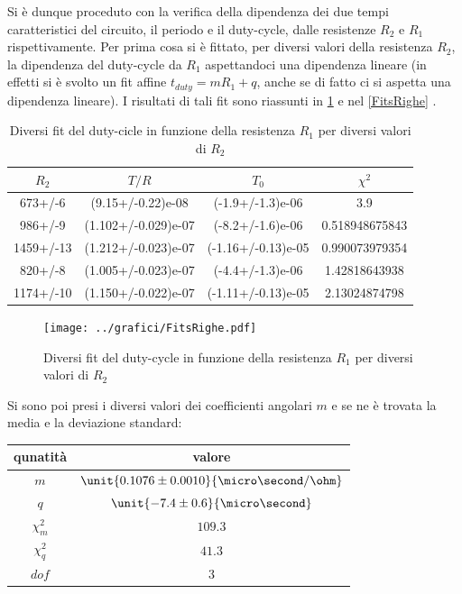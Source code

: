 \documentclass[a4paper,10pt]{article}
\begin{document}
Si è dunque proceduto con la verifica della dipendenza dei due tempi caratteristici del circuito, il periodo e il duty-cycle, dalle resistenze $R_2$ e $R_1$ rispettivamente. Per prima cosa si è fittato, per diversi valori della resistenza $R_2$, la dipendenza del duty-cycle da $R_1$ aspettandoci una dipendenza lineare (in effetti si è svolto un fit affine $t_{duty}=mR_1+q$, anche se di fatto ci si aspetta una dipendenza lineare). I risultati di tali fit sono riassunti in \cref{tab:DutyFit} e nel \cref{FitsRighe} . 

\begin{table}[H]
\centering
\begin{tabular}{c|c|c|c} 
$R_2$ & $T/R$ & $T_0$ & $\chi^2$\\
\hline
673+/-6 & (9.15+/-0.22)e-08 & (-1.9+/-1.3)e-06 & 3.9\\
986+/-9 & (1.102+/-0.029)e-07 & (-8.2+/-1.6)e-06 & 0.518948675843\\
1459+/-13 & (1.212+/-0.023)e-07 & (-1.16+/-0.13)e-05 & 0.990073979354\\
820+/-8 & (1.005+/-0.023)e-07 & (-4.4+/-1.3)e-06 & 1.42818643938\\
1174+/-10 & (1.150+/-0.022)e-07 & (-1.11+/-0.13)e-05 & 2.13024874798\\
\end{tabular}
\caption{Diversi fit del duty-cicle in funzione della resistenza $R_1$ per diversi valori di $R_2$}
\label{tab:DutyFit}
\end{table}

\begin{figure}[H]
	\centering
	\texttt{[image: ../grafici/FitsRighe.pdf]}
	\caption{Diversi fit del duty-cycle in funzione della resistenza $R_1$ per diversi valori di $R_2$}
	\label{fig:FitsRighe}
\end{figure}

Si sono poi presi i diversi valori dei coefficienti angolari $m$ e se ne è trovata la media e la deviazione standard:\\


\begin{table}[H]
\centering
\begin{tabular}{c|c} 
qunatità & valore\\
\hline
$m$&$\unit{0.1076 \pm 0.0010}{\micro\second/\ohm}$ \\
$q$&$\unit{-7.4 \pm 0.6}{\micro\second}$ \\
$\chi^2_m$&$109.3$\\
$\chi^2_q$&$41.3$\\
$dof$&$3$\\
\end{tabular}
\end{table}
\end{document}
